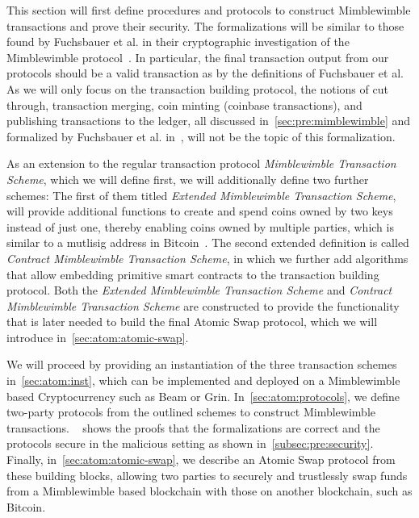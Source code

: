 This section will first define procedures and protocols to construct Mimblewimble transactions and prove their security.
The formalizations will be similar to those found by Fuchsbauer et al. in their cryptographic investigation of the Mimblewimble protocol~\cite{fuchsbauer2019aggregate}.
In particular, the final transaction output from our protocols should be a valid transaction as by the definitions of Fuchsbauer et al.
As we will only focus on the transaction building protocol, the notions of cut through, transaction merging, coin minting (coinbase transactions), and publishing transactions to the ledger, all discussed in~\cref{sec:pre:mimblewimble} and formalized by Fuchsbauer et al. in~\cite{fuchsbauer2019aggregate}, will not be the topic of this formalization.

As an extension to the regular transaction protocol \emph{Mimblewimble Transaction Scheme}, which we will define first, we will additionally define two further schemes:
The first of them titled \emph{Extended Mimblewimble Transaction Scheme}, will provide additional functions to create and spend coins owned by two keys instead of just one, thereby enabling coins owned by multiple parties, which is similar to a mutlisig address in Bitcoin~\cite{antonopoulos2014mastering}.
The second extended definition is called \emph{Contract Mimblewimble Transaction Scheme}, in which we further add algorithms that allow embedding primitive smart contracts to the transaction building protocol.
Both the \emph{Extended Mimblewimble Transaction Scheme} and \emph{Contract Mimblewimble Transaction Scheme} are constructed to provide the functionality that is later needed to build the final Atomic Swap protocol, which we will introduce in~\cref{sec:atom:atomic-swap}.

We will proceed by providing an instantiation of the three transaction schemes in~\cref{sec:atom:inst}, which can be implemented and deployed on a Mimblewimble based Cryptocurrency such as Beam or Grin.
In~\cref{sec:atom:protocols}, we define two-party protocols from the outlined schemes to construct Mimblewimble transactions.
~ shows the proofs that the formalizations are correct and the protocols secure in the malicious setting as shown in~\cref{subsec:pre:security}.
Finally, in~\cref{sec:atom:atomic-swap}, we describe an Atomic Swap protocol from these building blocks, allowing two parties to securely and trustlessly swap funds from a Mimblewimble based blockchain with those on another blockchain, such as Bitcoin.

